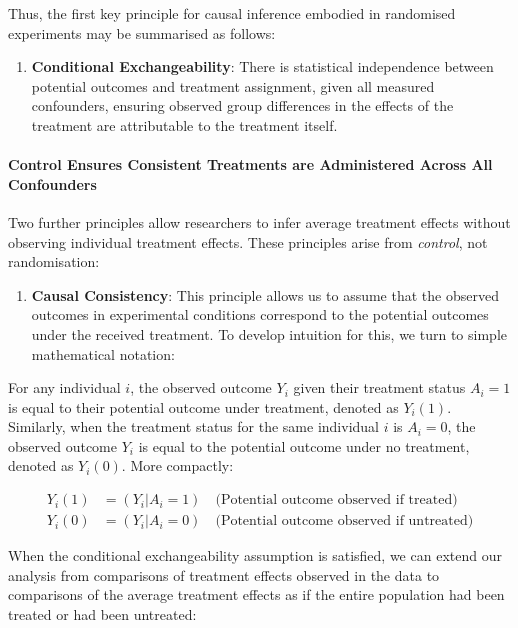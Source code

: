 \documentclass[
  singlecolumn]{article}
\let\oldparagraph\paragraph
\renewcommand{\paragraph}[1]{\oldparagraph{#1}\mbox{}}
\providecommand{\tightlist}{%
  \setlength{\itemsep}{0pt}\setlength{\parskip}{0pt}}\usepackage{longtable,booktabs,array}
\begin{document}
Thus, the first key principle for causal inference embodied in
randomised experiments may be summarised as follows:

\begin{enumerate}
\def\labelenumi{\arabic{enumi}.}
\tightlist
\item
  \textbf{Conditional Exchangeability}: There is statistical
  independence between potential outcomes and treatment assignment,
  given all measured confounders, ensuring observed group differences in
  the effects of the treatment are attributable to the treatment itself.
\end{enumerate}

\paragraph{Control Ensures Consistent Treatments are Administered Across
All
Confounders}\label{control-ensures-consistent-treatments-are-administered-across-all-confounders}

Two further principles allow researchers to infer average treatment
effects without observing individual treatment effects. These principles
arise from \emph{control}, not randomisation:

\begin{enumerate}
\def\labelenumi{\arabic{enumi}.}
\setcounter{enumi}{1}
\tightlist
\item
  \textbf{Causal Consistency}: This principle allows us to assume that
  the observed outcomes in experimental conditions correspond to the
  potential outcomes under the received treatment. To develop intuition
  for this, we turn to simple mathematical notation:
\end{enumerate}

For any individual \(i\), the observed outcome \(Y_i\) given their
treatment status \(A_i = 1\) is equal to their potential outcome under
treatment, denoted as \(Y_i(1)\). Similarly, when the treatment status
for the same individual \(i\) is \(A_i = 0\), the observed outcome
\(Y_i\) is equal to the potential outcome under no treatment, denoted as
\(Y_i(0)\). More compactly:

\[
\begin{aligned}
Y_{i}(1) &= (Y_{i}|A_{i} = 1) \quad \text{(Potential outcome observed if treated)} \\
Y_{i}(0) &= (Y_{i}|A_{i} = 0) \quad \text{(Potential outcome observed if untreated)}
\end{aligned}
\]

When the conditional exchangeability assumption is satisfied, we can
extend our analysis from comparisons of treatment effects observed in
the data to comparisons of the average treatment effects as if the
entire population had been treated or had been untreated:
\end{document}
